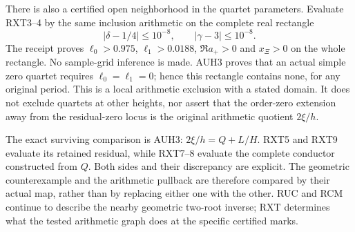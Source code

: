 There is also a certified open neighborhood in the quartet
parameters. Evaluate RXT3--4 by the same inclusion arithmetic on
the complete real rectangle
\[
 |\delta-1/4|\le10^{-8},\qquad|\gamma-3|\le10^{-8}.
 \tag{RXT9}
\]
The receipt proves $\ell_0>0.975$, $\ell_1>0.0188$,
$\Re a_+>0$ and $x_\Xi>0$ on the whole rectangle.
No sample-grid inference is made. AUH3 proves that an actual
simple zero quartet requires $\ell_0=\ell_1=0$; hence this
rectangle contains none, for any original period. This is a
local arithmetic exclusion with a stated domain. It does not
exclude quartets at other heights, nor assert that the order-zero
extension away from the residual-zero locus is the original
arithmetic quotient $2\xi/h$.

The exact surviving comparison is AUH3:
$2\xi/h=Q+L/H$. RXT5 and RXT9 evaluate its retained residual,
while RXT7--8 evaluate the complete conductor constructed from
$Q$. Both sides and their discrepancy are explicit. The geometric
counterexample and the arithmetic pullback are therefore compared
by their actual map, rather than by replacing either one with the
other. RUC and RCM continue to describe the nearby geometric
two-root inverse; RXT determines what the tested arithmetic graph
does at the specific certified marks.
